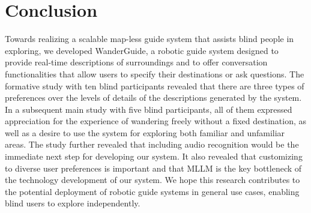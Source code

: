 \section{Conclusion}
Towards realizing a scalable map-less guide system that assists blind people in exploring, we developed WanderGuide, a robotic guide  system designed to provide real-time descriptions of surroundings and to offer conversation functionalities that allow users to specify their destinations or ask questions.
The formative study with ten blind participants revealed that there are three types of preferences over the levels of details of the descriptions generated by the system.
In a subsequent main study with five blind participants, all of them expressed appreciation for the experience of wandering freely without a fixed destination, as well as a desire to use the system for exploring both familiar and unfamiliar areas. 
The study further revealed that including audio recognition would be the immediate next step for developing our system. 
It also revealed that customizing to diverse user preferences is important and that MLLM is the key bottleneck of the technology development of our system.
We hope this research contributes to the potential deployment of robotic guide systems in general use cases, enabling blind users to explore independently.